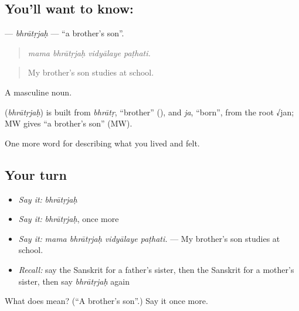 \subsection*{You'll want to know: }
\textbf{} — \emph{bhrātṛjaḥ} — \textquotedblleft{}a brother's son\textquotedblright{}.

\begin{quote}
   
\end{quote}

\begin{quote}
\emph{mama bhrātṛjaḥ vidyālaye paṭhati.}
\end{quote}

\begin{quote}
My brother's son studies at school.
\end{quote}

A masculine noun.

\begin{cousinweb}
\textbf{} (\emph{bhrātṛjaḥ}) is built from \emph{bhrātṛ}, \textquotedblleft{}brother\textquotedblright{} (\textbf{}), and \emph{ja}, \textquotedblleft{}born\textquotedblright{}, from the root √jan; MW gives \textquotedblleft{}a brother's son\textquotedblright{} (MW).
\end{cousinweb}

\begin{grammarlens}[title={What you've built}]
One more word for describing what you lived and felt.
\end{grammarlens}

\subsection*{Your turn}
\begin{itemize}
\raggedright
  \item \emph{Say it:} \emph{bhrātṛjaḥ}
  \item \emph{Say it:} \emph{bhrātṛjaḥ}, once more
  \item \emph{Say it:} \emph{mama bhrātṛjaḥ vidyālaye paṭhati.} — My brother's son studies at school.
  \item \emph{Recall:} say the Sanskrit for a father's sister, then the Sanskrit for a mother's sister, then say \emph{bhrātṛjaḥ} again
\end{itemize}

\begin{tcolorbox}[breakable,colback=teal!4,colframe=teal!35!black,title={Before you move on}]
What does  mean? (\textquotedblleft{}A brother's son\textquotedblright{}.) Say it once more.
\end{tcolorbox}
